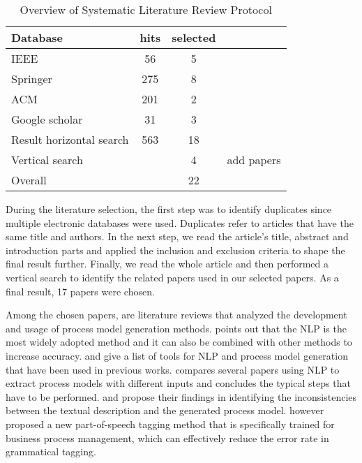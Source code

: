		\begin{table}[]
		\begin{center}
		\caption{\centering Overview of Systematic Literature Review Protocol}
		\begin{tabular}{lccl}
    	\textbf{Database}\hspace{30mm} & \textbf{hits} & \textbf{selected} &  \\
    	\hline
		IEEE                     		& 56   & 5   &      		\\
		Springer                 		& 275  & 8   &      		\\
		ACM                      		& 201  & 2   &      		\\
		Google scholar           		& 31   & 3   &      		\\
		\hline
		Result horizontal search	 	& 563  & 18  &      		\\
		Vertical search          		&      & 4   &  \hspace{5mm}add papers  \\
		\hline
		Overall                  		&      & 22   &     
		\end{tabular}
		\end{center}
	\end{table}
	
	During the literature selection, the first step was to identify duplicates since multiple electronic databases were used. Duplicates refer to articles that have the same title and authors. In the next step, we read the article's title, abstract and introduction parts and applied the inclusion and exclusion criteria to shape the final result further. Finally, we read the whole article and then performed a vertical search to identify the related papers used in our selected papers. As a final result, 17 papers were chosen. 
	
	Among the chosen papers, \cite{literature_review_1} \cite{literature_review_2} \cite{literature_review_3} \cite{literature_review_4} are literature reviews that analyzed the development and usage of process model generation methods. \cite{literature_review_3} points out that the NLP is the most widely adopted method and it can also be combined with other methods to increase accuracy. \cite{literature_review_1} and \cite{literature_review_3} give a list of tools for NLP and process model generation that have been used in previous works. \cite{literature_review_4} compares several papers using NLP to extract process models with different inputs and concludes the typical steps that have to be performed. \cite{complement_2} and \cite{complement_3} propose their findings in identifying the inconsistencies between the textual description and the generated process model. \cite{complement_4} however proposed a new part-of-speech tagging method that is specifically trained for business process management, which can effectively reduce the error rate in grammatical tagging.
	
